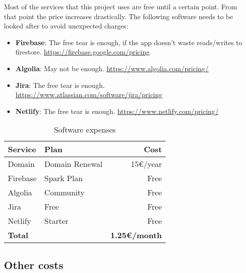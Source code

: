 Most of the services that this project uses are free until a certain point. From that point the price increases drastically. The following software needs to be looked after to avoid unexpected charges:
\begin{itemize}
    \item \textbf{Firebase}: The free tear is enough, if the app doesn't waste reads/writes to firestore.  \url{https://firebase.google.com/pricing}
    \item \textbf{Algolia}: May not be enough. \url{https://www.algolia.com/pricing/}
    \item \textbf{Jira}: The free tear is enough. \url{https://www.atlassian.com/software/jira/pricing}
    \item \textbf{Netlify}: The free tear is enough. \url{https://www.netlify.com/pricing/}
\end{itemize}

\begin{table}[h!]
\centering
\begin{tabular}{llr}
    \toprule
    \textbf{Service} & \textbf{Plan} & \textbf{Cost} \\
    \midrule
    Domain & Domain Renewal & 15€/year \\
    Firebase & Spark Plan & Free \\
    Algolia & Community & Free \\
    Jira & Free & Free \\
    Netlify & Starter & Free \\
    \midrule
    \textbf{Total} & & \textbf{1.25€/month} \\
    \bottomrule
\end{tabular}
\caption{Software expenses}
\label{service-costs-table}
\end{table}

\newpage
\subsection{Other costs}

